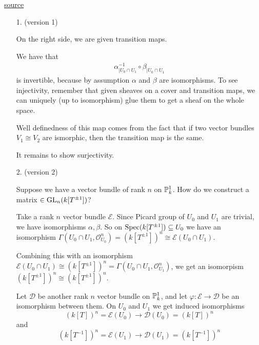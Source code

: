 \newcommand{\sheet}{9}




\maketitle{}

\begin{exercise}{2}
    \href{http://math.uchicago.edu/~may/REU2021/REUPapers/Davidovsky.pdf}{source}
    \begin{enumerate}
        \item[1. (version 1)]{
                On the right side, we are given transition maps. 
        
                We have that
                \begin{align*}
                    \alpha_{| U_0\cap U_1}^{-1} \circ \beta_{| U_0\cap U_1}
                \end{align*}
                is invertible, because by assumption $\alpha$ and $\beta$ are
                isomorphisms. To see injectivity, remember that given sheaves on
                a cover and transition maps, we can uniquely (up to isomorphism)
                glue them to get a sheaf on the whole space.

                Well definedness of this map comes from the fact that if two vector bundles 
                $V_1\cong V_2$ are ismorphic, then the transition map is the same.

                It remains to show surjectivity.
            }
        \item[2. (version 2)]{
            Suppose we have a vector bundle of rank $n$ on $\mathbb{P}^1_k$. How do
            we construct a matrix $\in \operatorname{GL}_n(k[T^{\pm 1}])$?

            Take a rank $n$ vector bundle $\mathcal{E}$. Since Picard group of
            $U_0$ and $U_1$ are trivial, we have isomorphisms $\alpha, \beta$.
            So on $\operatorname{Spec}(k[T^{\pm 1}]) \subseteq U_0$ we have an isomorphism
            $\Gamma(U_0 \cap U_1, \mathcal{O}^n_{U_0}) = (k[T^{\pm 1}])^n \cong
            \mathcal{E}(U_0 \cap U_1)$.

            Combining this with an isomorphism $\mathcal{E}(U_0 \cap U_1) \cong
            (k[T^{\pm 1}])^n = \Gamma(U_0 \cap U_1, \mathcal{O}^n_{U_1})$, we
            get an isomorpism $(k[T^{\pm 1}])^n \cong (k[T^{\pm 1}])^n$.

            Let $\mathcal{D}$ be another rank $n$ vector bundle on $\mathbb{P}^1_k$,
            and let $\varphi \colon \mathcal{E} \to \mathcal{D}$ be an
            isomorphism between them.
            On $U_0$ and $U_1$ we get induced isomorphisms
            \begin{equation*}
                (k[T])^n = \mathcal{E}(U_0) \to \mathcal{D}(U_0) = (k[T])^n
            \end{equation*}
            and
            \begin{equation*}
                (k[T^{-1}])^n = \mathcal{E}(U_1) \to \mathcal{D}(U_1) = (k[T^{-1}])^n
            \end{equation*}
        }
        

\end{enumerate}
\end{exercise}
